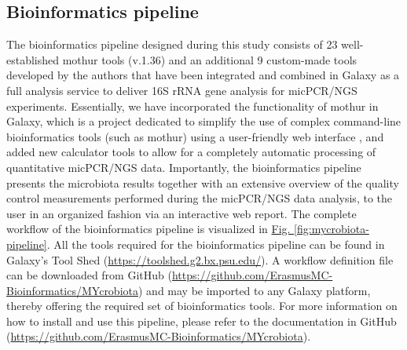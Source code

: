 \subsection*{Bioinformatics pipeline}
The bioinformatics pipeline designed during this study consists of 23 well-established mothur tools (v.1.36) \cite{schloss2009introducing} and an additional 9 custom-made tools developed by the authors that have been integrated and combined in Galaxy as a full analysis service to deliver 16S rRNA gene analysis for micPCR/NGS experiments. Essentially, we have incorporated the functionality of mothur in Galaxy, which is a project dedicated to simplify the use of complex command-line bioinformatics tools (such as mothur) using a user-friendly web interface \cite{giardine2005galaxy,blankenberg2010galaxy,goecks2010galaxy}, and added new calculator tools to allow for a completely automatic processing of quantitative micPCR/NGS data. Importantly, the bioinformatics pipeline presents the microbiota results together with an extensive overview of the quality control measurements performed during the micPCR/NGS data analysis, to the user in an organized fashion via an interactive web report. The complete workflow of the bioinformatics pipeline is visualized in \hyperref[fig:mycrobiota-pipeline]{Fig. \ref{fig:mycrobiota-pipeline}}. All the tools required for the bioinformatics pipeline can be found in Galaxy’s Tool Shed (\url{https://toolshed.g2.bx.psu.edu/}). A workflow definition file can be downloaded from GitHub (\url{https://github.com/ErasmusMC-Bioinformatics/MYcrobiota}) and may be imported to any Galaxy platform, thereby offering the required set of bioinformatics tools. For more information on how to install and use this pipeline, please refer to the documentation in GitHub (\url{https://github.com/ErasmusMC-Bioinformatics/MYcrobiota}).

